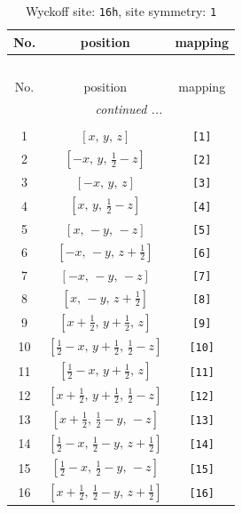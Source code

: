 \documentclass[fleqn,8pt]{jsarticle}
\begin{document}
\begin{longtable}{ccc}
\caption{Wyckoff site: {\tt 16h}, site symmetry: {\tt 1}}
 \\
 \hline \hline
No. & position & mapping \\ \hline \endfirsthead

\multicolumn{2}{l}{\tablename\ \thetable{}} \\
 \hline \hline
No. & position & mapping \\ \hline \endhead

 \hline \hline
\multicolumn{2}{r}{\footnotesize\it continued ...} \\ \endfoot

 \hline \hline
\multicolumn{2}{r}{} \\ \endlastfoot

1 & $\left[ x,\, y,\, z \right]$ & {\tt [1]} \\ \hline
2 & $\left[ - x,\, y,\, \frac{1}{2} - z \right]$ & {\tt [2]} \\ \hline
3 & $\left[ - x,\, y,\, z \right]$ & {\tt [3]} \\ \hline
4 & $\left[ x,\, y,\, \frac{1}{2} - z \right]$ & {\tt [4]} \\ \hline
5 & $\left[ x,\, - y,\, - z \right]$ & {\tt [5]} \\ \hline
6 & $\left[ - x,\, - y,\, z + \frac{1}{2} \right]$ & {\tt [6]} \\ \hline
7 & $\left[ - x,\, - y,\, - z \right]$ & {\tt [7]} \\ \hline
8 & $\left[ x,\, - y,\, z + \frac{1}{2} \right]$ & {\tt [8]} \\ \hline
9 & $\left[ x + \frac{1}{2},\, y + \frac{1}{2},\, z \right]$ & {\tt [9]} \\ \hline
10 & $\left[ \frac{1}{2} - x,\, y + \frac{1}{2},\, \frac{1}{2} - z \right]$ & {\tt [10]} \\ \hline
11 & $\left[ \frac{1}{2} - x,\, y + \frac{1}{2},\, z \right]$ & {\tt [11]} \\ \hline
12 & $\left[ x + \frac{1}{2},\, y + \frac{1}{2},\, \frac{1}{2} - z \right]$ & {\tt [12]} \\ \hline
13 & $\left[ x + \frac{1}{2},\, \frac{1}{2} - y,\, - z \right]$ & {\tt [13]} \\ \hline
14 & $\left[ \frac{1}{2} - x,\, \frac{1}{2} - y,\, z + \frac{1}{2} \right]$ & {\tt [14]} \\ \hline
15 & $\left[ \frac{1}{2} - x,\, \frac{1}{2} - y,\, - z \right]$ & {\tt [15]} \\ \hline
16 & $\left[ x + \frac{1}{2},\, \frac{1}{2} - y,\, z + \frac{1}{2} \right]$ & {\tt [16]} \\
\end{longtable}
\end{document}
